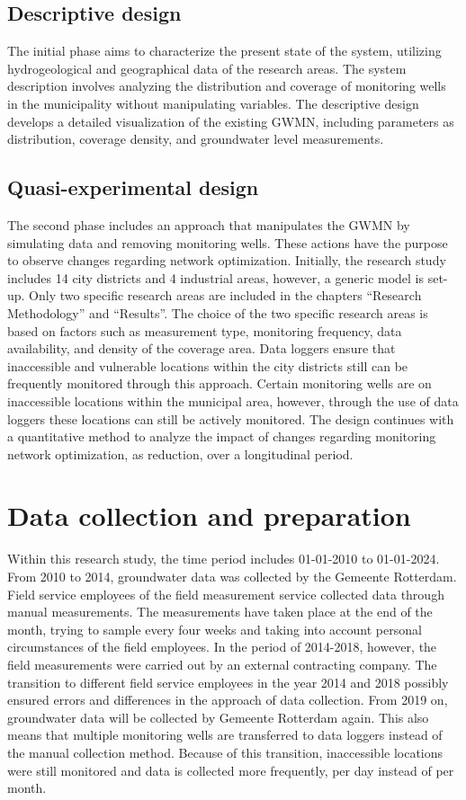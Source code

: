 \subsection{Descriptive design}
The initial phase aims to characterize the present state of the system, utilizing hydrogeological and geographical data of the research areas. The system description involves analyzing the distribution and coverage of monitoring wells in the municipality without manipulating variables. The descriptive design develops a detailed visualization of the existing GWMN, including parameters as distribution, coverage density, and groundwater level measurements.

\subsection{Quasi-experimental design}
The second phase includes an approach that manipulates the GWMN by simulating data and removing monitoring wells. These actions have the purpose to observe changes regarding network optimization. Initially, the research study includes 14 city districts and 4 industrial areas, however, a generic model is set-up. Only two specific research areas are included in the chapters “Research Methodology” and “Results”. The choice of the two specific research areas is based on factors such as measurement type, monitoring frequency, data availability, and density of the coverage area. Data loggers ensure that inaccessible and vulnerable locations within the city districts still can be frequently monitored through this approach. Certain monitoring wells are on inaccessible locations within the municipal area, however, through the use of data loggers these locations can still be actively monitored. The design continues with a quantitative method to analyze the impact of changes regarding monitoring network optimization, as reduction, over a longitudinal period.

\section{Data collection and preparation}
Within this research study, the time period includes 01-01-2010 to 01-01-2024. From 2010 to 2014, groundwater data was collected by the Gemeente Rotterdam. Field service employees of the field measurement service collected data through manual measurements. The measurements have taken place at the end of the month, trying to sample every four weeks and taking into account personal circumstances of the field employees. In the period of 2014-2018, however, the field measurements were carried out by an external contracting company. The transition to different field service employees in the year 2014 and 2018 possibly ensured errors and differences in the approach of data collection. From 2019 on, groundwater data will be collected by Gemeente Rotterdam again. This also means that multiple monitoring wells are transferred to data loggers instead of the manual collection method. Because of this transition, inaccessible locations were still monitored and data is collected more frequently, per day instead of per month.

